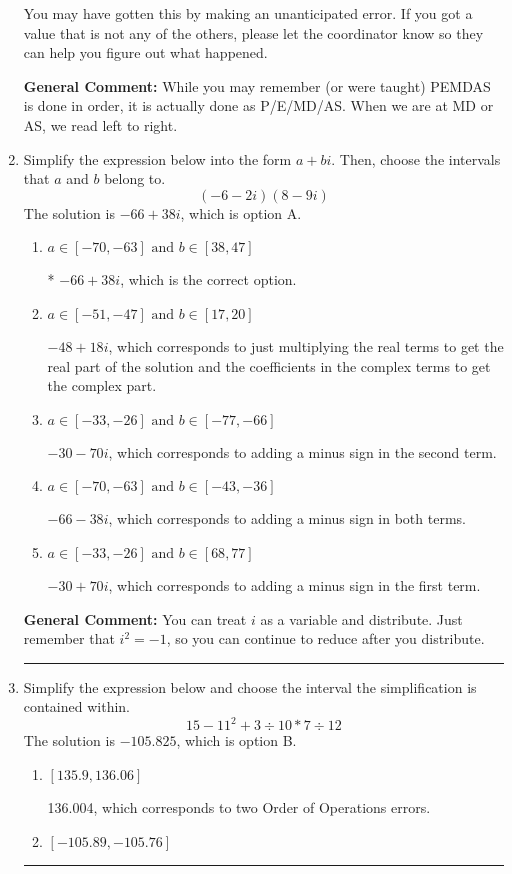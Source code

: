 \documentclass{extbook}[14pt]
\newcommand{\litem}[1]{\item #1

\rule{\textwidth}{0.4pt}}
\begin{document}
\begin{enumerate}
{\begin{enumerate}[label=\Alph*.]
 You may have gotten this by making an unanticipated error. If you got a value that is not any of the others, please let the coordinator know so they can help you figure out what happened.
\end{enumerate}

\textbf{General Comment:} While you may remember (or were taught) PEMDAS is done in order, it is actually done as P/E/MD/AS. When we are at MD or AS, we read left to right.
}
\litem{
Simplify the expression below into the form $a+bi$. Then, choose the intervals that $a$ and $b$ belong to.
\[ (-6 - 2 i)(8 - 9 i) \]The solution is \( -66 + 38 i \), which is option A.\begin{enumerate}[label=\Alph*.]
\item \( a \in [-70, -63] \text{ and } b \in [38, 47] \)

* $-66 + 38 i$, which is the correct option.
\item \( a \in [-51, -47] \text{ and } b \in [17, 20] \)

 $-48 + 18 i$, which corresponds to just multiplying the real terms to get the real part of the solution and the coefficients in the complex terms to get the complex part.
\item \( a \in [-33, -26] \text{ and } b \in [-77, -66] \)

 $-30 - 70 i$, which corresponds to adding a minus sign in the second term.
\item \( a \in [-70, -63] \text{ and } b \in [-43, -36] \)

 $-66 - 38 i$, which corresponds to adding a minus sign in both terms.
\item \( a \in [-33, -26] \text{ and } b \in [68, 77] \)

 $-30 + 70 i$, which corresponds to adding a minus sign in the first term.
\end{enumerate}

\textbf{General Comment:} You can treat $i$ as a variable and distribute. Just remember that $i^2=-1$, so you can continue to reduce after you distribute.
}
\litem{
Simplify the expression below and choose the interval the simplification is contained within.
\[ 15 - 11^2 + 3 \div 10 * 7 \div 12 \]The solution is \( -105.825 \), which is option B.\begin{enumerate}[label=\Alph*.]
\item \( [135.9, 136.06] \)

 136.004, which corresponds to two Order of Operations errors.
\item \( [-105.89, -105.76] \)


\end{enumerate}}
\end{enumerate}
\end{document}
